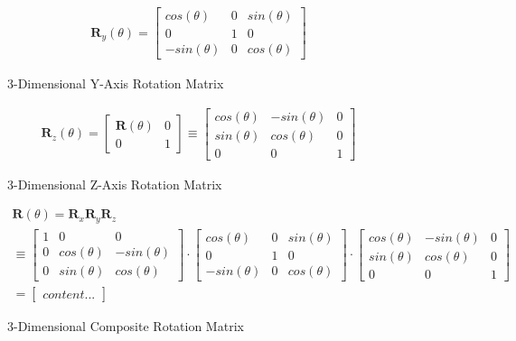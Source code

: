 \begin{figure}[h!]
\begin{gather} 
\textbf{R}_y(\theta) = 
\begin{bmatrix}
cos(\theta) & 0 & sin(\theta) \\
0 & 1 & 0\\
-sin(\theta) & 0 & cos(\theta)
\end{bmatrix}
\end{gather}
\label{equation:3dYRotMat} 
\caption{3-Dimensional Y-Axis Rotation Matrix}
\end{figure}

\begin{figure}[h!]
\begin{gather} 
\textbf{R}_z(\theta) = 
\begin{bmatrix}
\textbf{R}(\theta) & 0 \\
0 & 1
\end{bmatrix}
\equiv
\begin{bmatrix}
cos(\theta) & -sin(\theta) & 0 \\
sin(\theta) & cos(\theta) & 0 \\
0 & 0 & 1
\end{bmatrix}
\end{gather}
\label{equation:3dZRotMat} 
\caption{3-Dimensional Z-Axis Rotation Matrix}
\end{figure}

\begin{figure}[h!]
\begin{gather}
\textbf{R}(\theta) = \textbf{R}_x\textbf{R}_y\textbf{R}_z
\\
\equiv
\begin{bmatrix}
1 & 0 & 0 \\
0 & cos(\theta) & -sin(\theta)\\
0 & sin(\theta) & cos(\theta) 
\end{bmatrix}
\cdot
\begin{bmatrix}
cos(\theta) & 0 & sin(\theta) \\
0 & 1 & 0\\
-sin(\theta) & 0 & cos(\theta)
\end{bmatrix}
\cdot
\begin{bmatrix}
cos(\theta) & -sin(\theta) & 0 \\
sin(\theta) & cos(\theta) & 0 \\
0 & 0 & 1
\end{bmatrix}
\\
=
\begin{bmatrix}
content...
\end{bmatrix}
\end{gather}
\label{equation:3dRotMat}	
\caption{3-Dimensional Composite Rotation Matrix}
\end{figure}